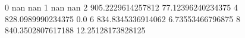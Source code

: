 0 nan nan
1 nan nan
2 905.2229614257812 77.12396240234375
4 828.0989990234375 0.0
6 834.8345336914062 6.73553466796875
8 840.3502807617188 12.25128173828125
